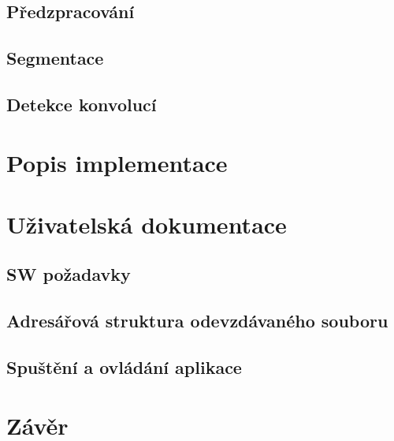 \documentclass[12pt, a4paper]{report}
\begin{document}
	\section{Předzpracování}
	\section{Segmentace}
	\section{Detekce konvolucí}


\chapter{Popis implementace}

\chapter{Uživatelská dokumentace}
	\section{SW požadavky}
	
	\section{Adresářová struktura odevzdávaného souboru}	
	
	\section{Spuštění a ovládání aplikace}	

\chapter{Závěr}
\end{document}
